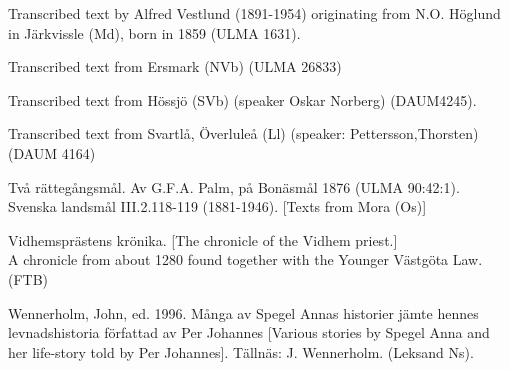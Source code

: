 \begin{listWWNumileveli}
\item {}

\begin{styleSource}
Transcribed text by Alfred Vestlund (1891-1954) originating from N.O. Höglund in Järkvissle (Md), born in 1859 (ULMA 1631).

\end{styleSource}

\item {}

\begin{styleSource}
\label{bkm:Ref137880753}Transcribed text from Ersmark (NVb) (ULMA 26833) 

\end{styleSource}

\item {}

\begin{styleSource}
\label{bkm:Ref137882624}Transcribed text from Hössjö (SVb) (speaker Oskar Norberg) (DAUM4245).

\end{styleSource}

\item {}

\begin{styleSource}
Transcribed text from Svartlå, Överluleå (Ll) (speaker: Pettersson,Thorsten) (DAUM 4164)

\end{styleSource}

\item {}

\begin{styleSource}
\label{bkm:Ref154203986}Två rättegångsmål. Av G.F.A. Palm, på Bonäsmål 1876 (ULMA 90:42:1). Svenska landsmål III.2.118-119 (1881-1946). [Texts from Mora (Os)]

\end{styleSource}

\item {}

\begin{styleSource}
\label{bkm:Ref261512115}\label{bkm:Ref137879614}Vidhemsprästens krönika. [The chronicle of the Vidhem priest.]\\
A chronicle from about 1280 found together with the Younger Västgöta Law. (FTB) 

\end{styleSource}

\item {}

\begin{styleSource}
\label{bkm:Ref150327539}\label{bkm:Ref150067493}Wennerholm, John, ed. 1996. Många av Spegel Annas historier jämte hennes levnadshistoria författad av Per Johannes [Various stories by Spegel Anna and her life-story told by Per Johannes]. Tällnäs: J. Wennerholm. (Leksand Ns). 

\end{styleSource}

\end{listWWNumileveli}

